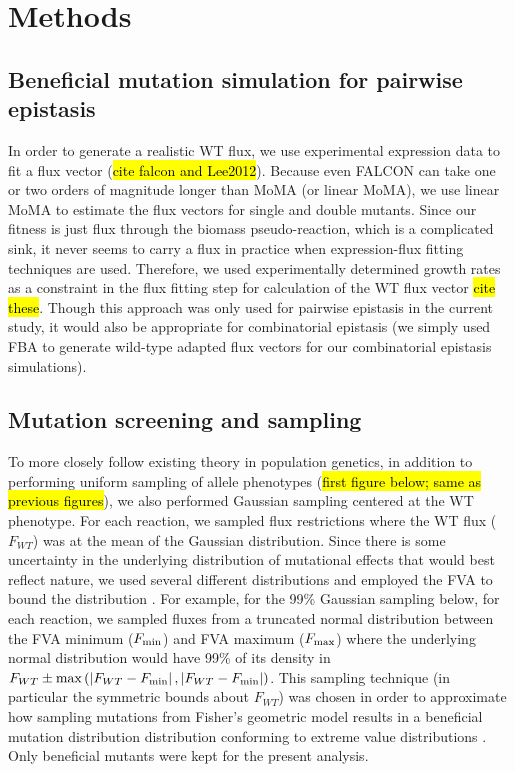 \section{Methods}
\label{sec:epiBeneMethod}
%
%
\newcommand{\FVAmin}{F_{\textnormal{min}}}
\newcommand{\FVAmax}{F_{\textnormal{max}}}

\subsection{Beneficial mutation simulation for pairwise epistasis}
\label{sec:falconLMoMAEpistasis}
In order to generate a realistic WT flux, we use experimental
expression data to fit a flux vector (\hl{cite falcon and
Lee2012}). Because even FALCON can take one or two orders of magnitude
longer than MoMA (or linear MoMA), we use linear MoMA to estimate the
flux vectors for single and double mutants. Since our fitness is just
flux through the biomass pseudo-reaction, which is a complicated sink,
it never seems to carry a flux in practice when expression-flux
fitting techniques are used. Therefore, we used experimentally
determined growth rates as a constraint in the flux fitting step for
calculation of the WT flux vector \hl{cite these}. Though this
approach was only used for pairwise epistasis in the current study, it
would also be appropriate for combinatorial epistasis (we simply used
FBA to generate wild-type adapted flux vectors for our combinatorial
epistasis simulations).


\subsection{Mutation screening and sampling}
\label{sec:epiBeneMethodSS}

To more closely follow existing theory in population genetics, in
addition to performing uniform sampling of allele phenotypes (\hl{first
figure below; same as previous figures}), we also performed Gaussian
sampling centered at the WT phenotype. For each reaction, we sampled
flux restrictions where the WT flux ($F_{WT}$) was at the mean of the
Gaussian distribution. Since there is some uncertainty in the
underlying distribution of mutational effects that would best reflect
nature, we used several different distributions and employed the FVA
to bound the distribution \citep{Muller2013}. For example, for the
99\% Gaussian sampling below, for each reaction, we sampled fluxes
from a truncated normal distribution between the FVA minimum
($\FVAmin$) and FVA maximum ($\FVAmax$) where the underlying normal
distribution would have 99\% of its density in $F_{WT} \pm
\textnormal{max}\left( \left|F_{WT}-\FVAmin\right|,
\left|F_{WT}-\FVAmin\right|\right)$. This sampling technique (in
particular the symmetric bounds about $F_{WT}$) was chosen in order to
approximate how sampling mutations from Fisher's geometric model
results in a beneficial mutation distribution distribution conforming
to extreme value distributions \citep{Orr2005, Orr2006}. Only
beneficial mutants were kept for the present analysis.

